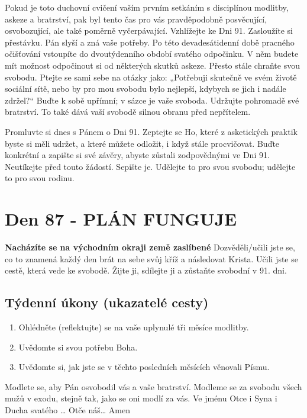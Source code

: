 \documentclass[11pt]{article}
\newcommand{\zacatekTrinactyTyden}{
\textbf{Nacházíte se na východním okraji země zaslíbené} \newline 
Dozvěděli/učili jste se, co to znamená každý den brát na sebe svůj kříž a následovat Krista. Učili jste se cestě, která vede ke svobodě. Žijte ji, sdílejte ji a zůstaňte svobodní v 91. dni.

\subsection*{Týdenní úkony (ukazatelé cesty)}
\begin{enumerate}
  \item Ohlédněte (reflektujte) se na vaše uplynulé tři měsíce modlitby.
  \item Uvědomte si svou potřebu Boha.
  \item Uvědomte si, jak jste se v těchto posledních měsících věnovali Písmu.
\end{enumerate}
Modlete se, aby Pán osvobodil vás a vaše bratrství. \newline
Modleme se za svobodu všech mužů v exodu, stejně tak, jako se oni modlí za vás.\newline
Ve jménu Otce i Syna i Ducha svatého …  Otče náš… Amen
}
\begin{document}
Pokud je toto duchovní cvičení vaším prvním setkáním s disciplínou modlitby, askeze a bratrství, pak byl tento čas pro vás
pravděpodobně posvěcující, osvobozující, ale také poměrně vyčerpávající. Vzhlížejte ke Dni 91. Zasloužíte si přestávku. Pán slyší
a zná vaše potřeby. Po této devadesátidenní době pracného očišťování vstoupíte do dvoutýdenního období svatého odpočinku.
V něm budete mít možnost odpočinout si od některých skutků askeze. Přesto stále chraňte svou svobodu. Ptejte se sami sebe na
otázky jako: „Potřebuji skutečně ve svém životě sociální sítě, nebo by pro mou svobodu bylo nejlepší, kdybych se jich i nadále
zdržel?“ Buďte k sobě upřímní; v sázce je vaše svoboda. Udržujte pohromadě své bratrství. To také dává vaší svobodě silnou
obranu před nepřítelem.

Promluvte si dnes s Pánem o Dni 91. Zeptejte se Ho, které z asketických praktik byste si měli udržet, a které můžete odložit, i když
stále procvičovat. Buďte konkrétní a zapište si své závěry, abyste zůstali zodpovědnými ve Dni 91. Neutíkejte před touto žádostí.
Sepište je. Udělejte to pro svou svobodu; udělejte to pro svou rodinu.


\newpage
\section{Den 87 - PLÁN FUNGUJE}
\zacatekTrinactyTyden
\end{document}
